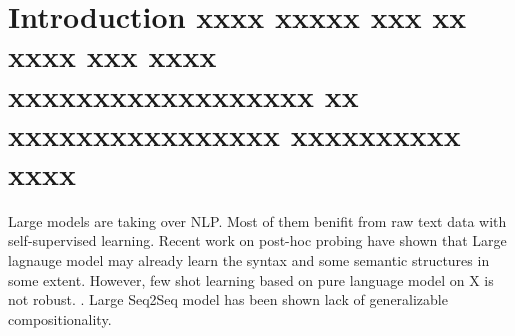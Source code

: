 
\chapter{Introduction xxxx xxxxx xxx xx xxxx xxx xxxx xxxxxxxxxxxxxxxxxx xx xxxxxxxxxxxxxxxx xxxxxxxxxx xxxx}
\label{chap:intro}

Large models are taking over NLP. Most of them
benifit from raw text data with self-supervised
learning.  Recent work on post-hoc probing have shown
that Large lagnauge model may already learn the syntax and some
semantic structures in some extent. However, few shot learning based
on pure language model on X is not robust. . Large Seq2Seq model has been shown lack of
generalizable compositionality. 


%
%
%
%

